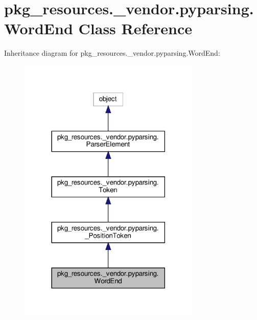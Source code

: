 \hypertarget{classpkg__resources_1_1__vendor_1_1pyparsing_1_1WordEnd}{}\section{pkg\+\_\+resources.\+\_\+vendor.\+pyparsing.\+Word\+End Class Reference}
\label{classpkg__resources_1_1__vendor_1_1pyparsing_1_1WordEnd}


Inheritance diagram for pkg\+\_\+resources.\+\_\+vendor.\+pyparsing.\+Word\+End\+:
\nopagebreak
\begin{figure}[H]
\begin{center}
\leavevmode
\includegraphics[width=246pt]{classpkg__resources_1_1__vendor_1_1pyparsing_1_1WordEnd__inherit__graph}
\end{center}
\end{figure}


